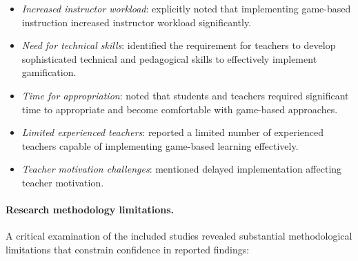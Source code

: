 \documentclass[a4paper,fleqn]{cas-sc}
\begin{document}
\begin{itemize}[noitemsep]
 \item \textit{Increased instructor workload}: \citet{8Yu2014} explicitly noted that implementing game-based instruction increased instructor workload significantly.
 
 \item \textit{Need for technical skills}: \citet{25Repantis2011502, 60Hoy2018} identified the requirement for teachers to develop sophisticated technical and pedagogical skills to effectively implement gamification.
 
 \item \textit{Time for appropriation}: \citet{65Razak201139} noted that students and teachers required significant time to appropriate and become comfortable with game-based approaches.
 
 \item \textit{Limited experienced teachers}: \citet{72hutauruk2020utilization} reported a limited number of experienced teachers capable of implementing game-based learning effectively.
 
 \item \textit{Teacher motivation challenges}: \citet{60Hoy2018} mentioned delayed implementation affecting teacher motivation.
\end{itemize}

\paragraph{Research methodology limitations.}

A critical examination of the included studies revealed substantial methodological limitations that constrain confidence in reported findings:
\end{document}
